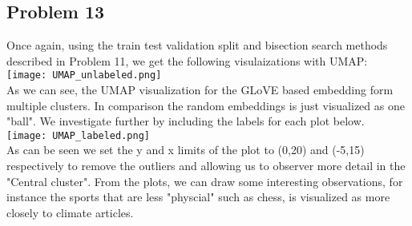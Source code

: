 \documentclass[11pt]{article}
\begin{document}
\begin{multicols}{2}
\subsection*{Problem 13}
Once again, using the train test validation split and bisection search methods described in Problem 11, we get the following visulaizations with UMAP:\\
\texttt{[image: UMAP\_unlabeled.png]}\\
As we can see, the UMAP visualization for the GLoVE based embedding form multiple clusters. In comparison the random embeddings is just visualized as one "ball". We investigate further by including the labels for each plot below.\\
\texttt{[image: UMAP\_labeled.png]}\\
As can be seen we set the y and x limits of the plot to (0,20) and (-5,15)
respectively to remove the outliers and allowing us to observer more detail in the "Central cluster". From the plots, we can draw some interesting observations, for instance the sports that are less "physcial" such as chess, is visualized as more closely to climate articles.
\end{multicols}
\end{document}
